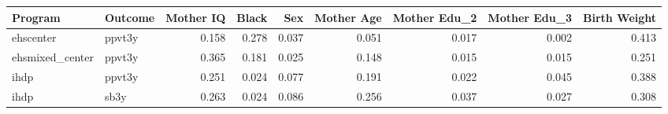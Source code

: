 \begin{table}[ht]
\centering
\begin{tabular}{llrrrrrrr}
  \hline
Program & Outcome & Mother IQ & Black & Sex & Mother Age & Mother Edu\_2 & Mother Edu\_3 & Birth Weight \\ 
  \hline
ehscenter & ppvt3y & 0.158 & 0.278 & 0.037 & 0.051 & 0.017 & 0.002 & 0.413 \\ 
  ehsmixed\_center & ppvt3y & 0.365 & 0.181 & 0.025 & 0.148 & 0.015 & 0.015 & 0.251 \\ 
  ihdp & ppvt3y & 0.251 & 0.024 & 0.077 & 0.191 & 0.022 & 0.045 & 0.388 \\ 
  ihdp & sb3y & 0.263 & 0.024 & 0.086 & 0.256 & 0.037 & 0.027 & 0.308 \\ 
   \hline
\end{tabular}
\end{table}
